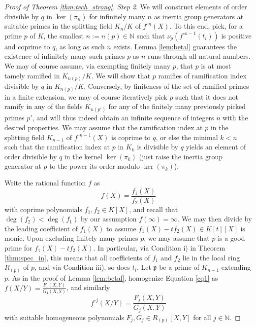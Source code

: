 \documentclass[a4paper]{amsart}
\begin{document}
\begin{proof}[Proof of Theorem \ref{thm:tech_strong}]
{\it Step 2}. 
We will construct elements of order divisible by $q$ in $\ker(\pi_n)$ for infinitely many $n$ as inertia group generators at suitable primes in the splitting field $K_n/K$ of $f^{\circ n}(X)$. To this end, pick, for a prime $p$ of $K$, the smallest $n:=n(p)\in \mathbb{N}$ such that  $\nu_p(f^{\circ n-1}(t_i))$ is positive and coprime to $q$, as long as such $n$ exists. Lemma \ref{lem:betal} guarantees the existence of infinitely many such primes $p$ as $n$ runs through all natural numbers. We may of course assume, via exempting finitely many $p$, that $p$ is at most tamely ramified in $K_{n(p)}/K$. We will show that $p$ ramifies of ramification index divisible by $q$ in $K_{n(p)}/K$. Conversely, by finiteness of the set of ramified primes in a finite extension, we may of course iteratively pick $p$ such that it does not ramify in any of the fields $K_{n(p')}$ for any of the finitely many previously picked primes $p'$, and will thus indeed obtain an infinite sequence of integers $n$ with the desired properties. We may assume that the ramification index at $p$ in the splitting field $K_{n-1}$ of $f^{\circ n-1}(X)$ is coprime to $q$, or else the minimal $k<n$ such that the ramification index at $p$ in $K_k$ is divisible by $q$ yields an element of order divisible by $q$ in the kernel $\ker(\pi_k)$ (just raise the inertia group generator at $p$ to the power its order modulo $\ker(\pi_k)$). 

Write the rational function $f$ as  \begin{equation}
\label{eq1}
f(X)=\frac{f_1(X)}{f_2(X)}\end{equation} with coprime  polynomials $f_1,f_2\in K[X]$, and recall that $\deg(f_2)<\deg(f_1)$ by our assumption $f(\infty)=\infty$.
We may then divide by the leading coefficient of $f_1(X)$ to assume $f_1(X)-tf_2(X)\in K[t][X]$ is monic. Upon excluding finitely many primes $p$, we may assume that $p$ is a good prime for $f_1(X)-tf_2(X)$. In particular, via Condition i) in Theorem \ref{thm:spec_in}, this means that all coefficients of $f_1$ and $f_2$ lie in the local ring $R_{(p)}$ of $p$, and via Condition iii), so does $t_i$. 
Let $\mathfrak{p}$ be a prime of $K_{n-1}$ extending $p$. As in the proof of Lemma \ref{lem:betal}, homogenize Equation \eqref{eq1} as $f(X/Y)=\frac{F_1(X,Y)}{G_1(X,Y)}$, and similarly \begin{equation}
\label{eq2}
f^{\circ j}(X/Y)=\frac{F_j(X,Y)}{G_j(X,Y)}
\end{equation}
with suitable homogeneous polynomials $F_j,G_j\in R_{(p)}[X,Y]$ for all $j\in \mathbb{N}$.


\end{proof}
\end{document}
